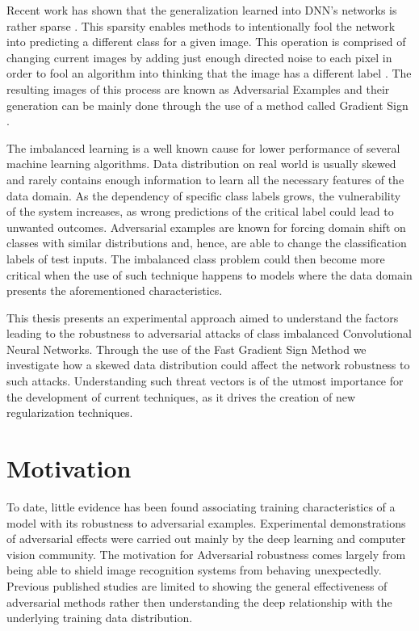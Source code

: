 Recent work has shown that the generalization learned into DNN's networks is rather sparse \cite{goodfellow2016}. This sparsity enables methods to intentionally fool the network into predicting a different class for a given image. This operation is comprised of changing current images by adding just enough directed noise to each pixel in order to fool an algorithm into thinking that the image has a different label \cite{goodfellow2014}\cite{papernot2016transf}\cite{goodfellow2016}\cite{szegedy2013}. The resulting images of this process are known as Adversarial Examples and their generation can be mainly done through the use of a method called Gradient Sign \cite{goodfellow2014}.

The imbalanced learning is a well known cause for lower performance of several machine learning algorithms. Data distribution on real world is usually skewed and rarely contains enough information to learn all the necessary features of the data domain. As the dependency of specific class labels grows, the vulnerability of the system increases, as wrong predictions of the critical label could lead to unwanted outcomes. Adversarial examples are known for forcing domain shift on classes with similar distributions and, hence, are able to change the classification labels of test inputs. The imbalanced class problem could then become more critical when the use of such technique happens to models where the data domain presents the aforementioned characteristics.

This thesis presents an experimental approach aimed to understand the factors leading to the robustness to adversarial attacks of  class imbalanced Convolutional Neural Networks. Through the use of the Fast Gradient Sign Method we investigate how a skewed data distribution could affect the network robustness to such attacks. Understanding such threat vectors is of the utmost importance for the development of current techniques, as it drives the creation of new regularization techniques.


\section{Motivation}

To date, little evidence has been found associating training characteristics of a model with its robustness to adversarial examples. Experimental demonstrations of adversarial effects were carried out mainly by the deep learning and computer vision community. The motivation for Adversarial robustness comes largely from being able to shield image recognition systems from behaving unexpectedly. Previous published studies are limited to showing the general effectiveness of adversarial methods rather then understanding the deep relationship with the underlying training data distribution.

